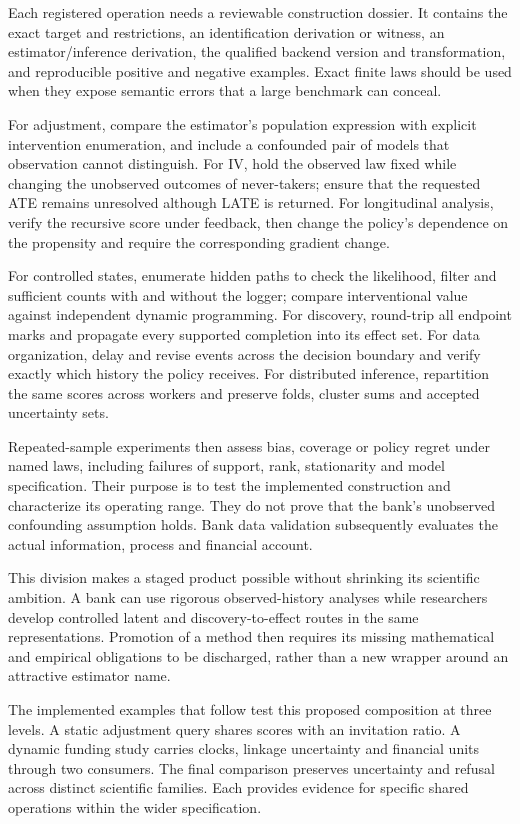 Each registered operation needs a reviewable construction dossier. It
contains the exact target and restrictions, an identification derivation
or witness, an estimator/inference derivation, the qualified backend
version and transformation, and reproducible positive and negative
examples. Exact finite laws should be used when they expose semantic
errors that a large benchmark can conceal.

For adjustment, compare the estimator's population expression with
explicit intervention enumeration, and include a confounded pair of
models that observation cannot distinguish. For IV, hold the observed
law fixed while changing the unobserved outcomes of never-takers; ensure
that the requested ATE remains unresolved although LATE is returned.
For longitudinal analysis, verify the recursive score under feedback,
then change the policy's dependence on the propensity and require the
corresponding gradient change.

For controlled states, enumerate hidden paths to check the likelihood,
filter and sufficient counts with and without the logger; compare
interventional value against independent dynamic programming. For
discovery, round-trip all endpoint marks and propagate every supported
completion into its effect set. For data organization, delay and revise
events across the decision boundary and verify exactly which history
the policy receives. For distributed inference, repartition the same
scores across workers and preserve folds, cluster sums and accepted
uncertainty sets.

Repeated-sample experiments then assess bias, coverage or policy regret
under named laws, including failures of support, rank, stationarity
and model specification. Their purpose is to test the implemented
construction and characterize its operating range. They do not prove
that the bank's unobserved confounding assumption holds. Bank data
validation subsequently evaluates the actual information, process
and financial account.

This division makes a staged product possible without shrinking its
scientific ambition. A bank can use rigorous observed-history analyses
while researchers develop controlled latent and discovery-to-effect
routes in the same representations. Promotion of a method then requires
its missing mathematical and empirical obligations to be discharged,
rather than a new wrapper around an attractive estimator name.

The implemented examples that follow test this proposed composition at
three levels. A static adjustment query shares scores with an invitation
ratio. A dynamic funding study carries clocks, linkage uncertainty and
financial units through two consumers. The final comparison preserves
uncertainty and refusal across distinct scientific families. Each provides
evidence for specific shared operations within the wider specification.



